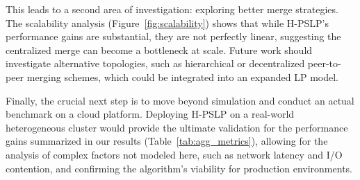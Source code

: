 \documentclass{article}
\begin{document}
This leads to a second area of investigation: exploring better merge strategies. The scalability analysis (Figure~\ref{fig:scalability}) shows that while H-PSLP's performance gains are substantial, they are not perfectly linear, suggesting the centralized merge can become a bottleneck at scale. Future work should investigate alternative topologies, such as hierarchical or decentralized peer-to-peer merging schemes, which could be integrated into an expanded LP model.

Finally, the crucial next step is to move beyond simulation and conduct an actual benchmark on a cloud platform. Deploying H-PSLP on a real-world heterogeneous cluster would provide the ultimate validation for the performance gains summarized in our results (Table~\ref{tab:agg_metrics}), allowing for the analysis of complex factors not modeled here, such as network latency and I/O contention, and confirming the algorithm's viability for production environments.





\printbibliography
\end{document}
